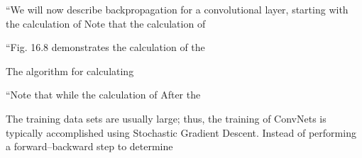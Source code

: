\documentclass[7pt]{article}
\begin{document}
“We will now describe backpropagation for a convolutional layer, starting with the calculation of %
Note that the calculation of %

“Fig. 16.8 demonstrates the calculation of the %

The algorithm for calculating %

“Note that while the calculation of %
After the %

The training data sets are usually large; thus, the training of ConvNets is typically accomplished using Stochastic Gradient Descent. Instead of performing a forward–backward step to determine %
\end{document}
